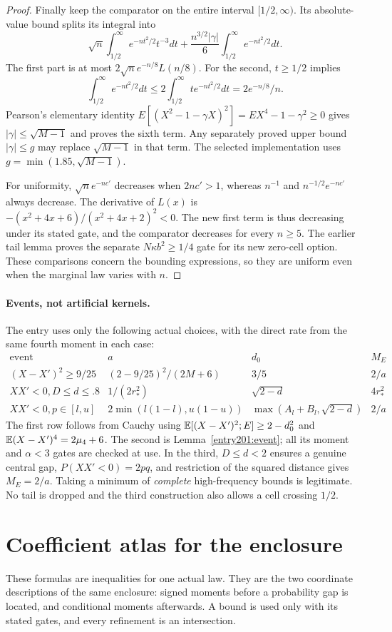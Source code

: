 \begin{proof}
Finally keep the comparator on the entire interval $[1/2,\infty)$.
Its absolute-value bound splits its integral into
\[
 \sqrt n\int_{1/2}^{\infty}e^{-nt^2/2}t^{-3}dt
 +\frac{n^{3/2}|\gamma|}{6}
                 \int_{1/2}^{\infty}e^{-nt^2/2}dt.
\]
The first part is at most $2\sqrt n e^{-n/8}L(n/8)$.
For the second, $t\ge1/2$ implies
\[
 \int_{1/2}^{\infty}e^{-nt^2/2}dt
 \le2\int_{1/2}^{\infty}t e^{-nt^2/2}dt
 =2e^{-n/8}/n.
\]
Pearson's elementary identity
$E[(X^2-1-\gamma X)^2]=EX^4-1-\gamma^2\ge0$
gives $|\gamma|\le\sqrt{M-1}$ and proves the sixth term.
Any separately proved upper bound $|\gamma|\le g$ may replace
$\sqrt{M-1}$ in that term. The selected implementation uses
$g=\min(1.85,\sqrt{M-1})$.

For uniformity, $\sqrt n e^{-nc'}$ decreases when $2nc'>1$,
whereas $n^{-1}$ and $n^{-1/2}e^{-nc'}$ always decrease.
The derivative of $L(x)$ is
$-(x^2+4x+6)/(x^2+4x+2)^2<0$.
The new first term is thus decreasing under its stated gate, and the
comparator decreases for every $n\ge5$. The earlier tail lemma proves
the separate $N\kappa b^2\ge1/4$ gate for its new zero-cell option.
These comparisons concern the bounding expressions, so they are uniform
even when the marginal law varies with $n$.
\end{proof}\paragraph{Events, not artificial kernels.}\label{fourier:events}
The entry uses only the following actual choices, with the direct rate
from the same fourth moment in each case:
\[
\begin{array}{c|c|c|c}
 \text{event}&a&d_0&M_E\\\hline
 (X-X')^2\ge9/25 &(2-9/25)^2/(2M+6)&3/5&2/a\\
 XX'<0, D\le d\le.8 &1/(2r_*^2)&\sqrt{2-d}&4r_*^2\\
 XX'<0, p\in[l,u] &2\min(l(1-l),u(1-u))
 &\max(A_l+B_l,\sqrt{2-d})&2/a
\end{array}
\]
The first row follows from Cauchy using
$\mathbb E[(X-X')^2;E]\ge2-d_0^2$ and
$\mathbb E(X-X')^4=2\mu_4+6$. The second is Lemma~\ref{entry201:event}; all its moment and $\alpha<3$ gates are checked at use.
In the third, $D\le d<2$ ensures a genuine central gap,
$P(XX'<0)=2pq$, and restriction of the squared distance gives $M_E=2/a$.
Taking a minimum of \emph{complete} high-frequency bounds is legitimate. No tail is
dropped and the third construction also allows a cell crossing $1/2$.


\section{Coefficient atlas for the enclosure}\label{re:atlas}
These formulas are inequalities for one actual law. They are the two
coordinate descriptions of the same enclosure: signed moments before a
probability gap is located, and conditional moments afterwards. A bound
is used only with its stated gates, and every refinement is an intersection.
